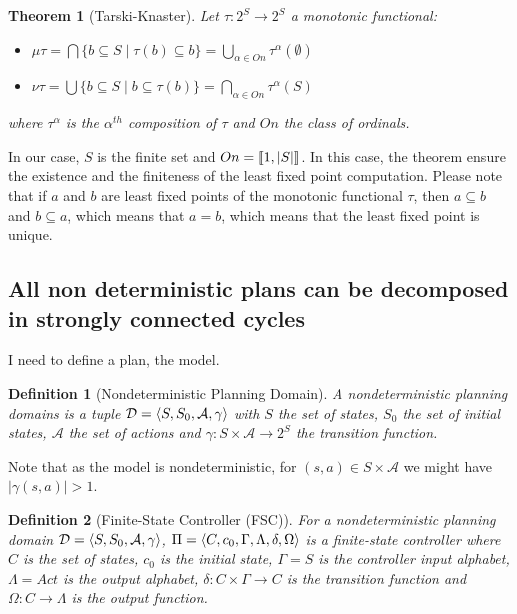 \documentclass{article}
\theoremstyle{named}
\newtheorem*{namedtheorem}{Theorem}
\newtheorem*{nameddefinition}{Definition}
\newcommand{\thmsymbol}{\( \blacktriangle \)}
\newcommand{\propsymbol}{\( \blacklozenge \)}
\newenvironment{nameddef}[1]
    {\begin{samepage}
    \begin{nameddefinition}[#1]
    \renewcommand{\qedsymbol}{\thmsymbol}\pushQED{\qed}
    }
    {
    \popQED %
    \end{nameddefinition} 
    \end{samepage}
    }
\newenvironment{namedtheo}[1]
    {\begin{samepage}
    \begin{namedtheorem}[#1]
    \renewcommand{\qedsymbol}{\propsymbol}\pushQED{\qed}
    }
    {
    \popQED %
    \end{namedtheorem} 
    \end{samepage}
    }
\newcommand{\splitatcommas}[1]{%
  \begingroup
  \begingroup\lccode`~=`, \lowercase{\endgroup
    \edef~{\mathchar\the\mathcode`, \penalty0 \noexpand\hspace{0pt plus 1em}}%
  }\mathcode`,="8000 #1%
  \endgroup
}
\newcommand{\intleft}{ \ensuremath{\left \llbracket} }
\newcommand{\intright}{ \ensuremath{\right \rrbracket} }
\begin{document}
\begin{namedtheo}{Tarski-Knaster}\label{th:tarski}
Let $\tau:2^S \rightarrow 2^S$ a monotonic functional:
\begin{itemize}
\item $\mu \tau = \bigcap \{b \subseteq S \mid \tau(b) \subseteq b\} = \bigcup_{\alpha \in On} \tau^{\alpha}(\emptyset)$
\item $\nu \tau = \bigcup \{b \subseteq S \mid b \subseteq \tau(b) \} = \bigcap_{\alpha \in On} \tau^{\alpha}(S)$
\end{itemize}
where $\tau^{\alpha}$ is the $\alpha^{th}$ composition of $\tau$ and $On$ the class of ordinals.
\end{namedtheo}
In our case, $S$ is the finite set and $On = \intleft 1,|S|\intright$. 
In this case, the theorem ensure the existence and the finiteness of the least fixed point computation.
Please note that if $a$ and $b$ are least fixed points of the monotonic functional $\tau$, then $a \subseteq b$ and $b \subseteq a$, which means that $a=b$, which means that the least fixed point is unique.

\subsection{All non deterministic plans can be decomposed in strongly connected cycles}

\newcommand{\planningdomain}{\ensuremath{ \splitatcommas{\langle S, S_0, \mathcal{A}, \gamma \rangle} }}

\newcommand{\controller}{\ensuremath{\splitatcommas{ \langle C, c_0, \Gamma, \Lambda, \delta, \Omega \rangle}}}

\newcommand{\planningproblem}{\ensuremath{\splitatcommas{ \langle \mathcal{D}, G \rangle}}}
I need to define a plan, the model.

\begin{nameddef}{Nondeterministic Planning Domain}
A nondeterministic planning domains is a tuple 
$\mathcal{D} = \planningdomain$
with
$S$ the set of states,
$S_0$ the set of initial states,
$\mathcal{A}$ the set of actions and
$\gamma : S \times \mathcal{A} \rightarrow 2^S$ the transition function.
\end{nameddef}

Note that as the model is nondeterministic, for $(s,a) \in S \times \mathcal{A}$ we might have $|\gamma(s,a)|>1$.

\begin{nameddef}{Finite-State Controller (FSC)}
For a nondeterministic planning domain
$\mathcal{D} = \planningdomain$,
$\Pi = \controller$ is a finite-state controller where
$C$ is the set of states,
$c_0$ is the initial state,
$\Gamma = S$ is the controller input alphabet,
$\Lambda = Act$ is the output alphabet,
$\delta: C \times \Gamma \rightarrow C$ is the transition function and 
$\Omega: C \rightarrow \Lambda$ is the output function.
\end{nameddef}
\end{document}
